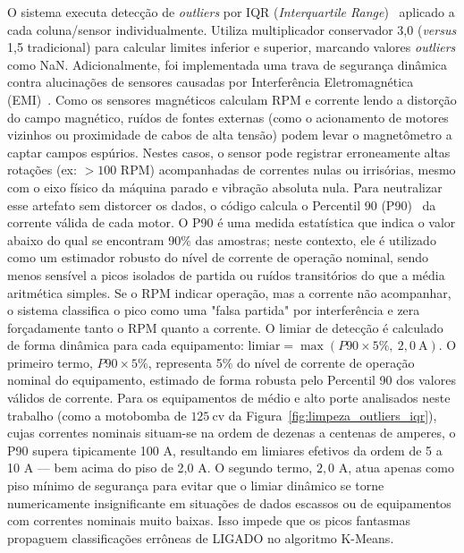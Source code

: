 O sistema executa detecção de \textit{outliers} por IQR (\textit{Interquartile Range})~\cite{tukey1977iqr} aplicado a cada coluna/sensor individualmente. Utiliza multiplicador conservador 3,0 (\textit{versus} 1,5 tradicional) para calcular limites inferior e superior, marcando valores \textit{outliers} como NaN. Adicionalmente, foi implementada uma trava de segurança dinâmica contra alucinações de sensores causadas por Interferência Eletromagnética (EMI)~\cite{romary2022airgap}. Como os sensores magnéticos calculam RPM e corrente lendo a distorção do campo magnético, ruídos de fontes externas (como o acionamento de motores vizinhos ou proximidade de cabos de alta tensão) podem levar o magnetômetro a captar campos espúrios. Nestes casos, o sensor pode registrar erroneamente altas rotações (ex: $> 100$ RPM) acompanhadas de correntes nulas ou irrisórias, mesmo com o eixo físico da máquina parado e vibração absoluta nula. Para neutralizar esse artefato sem distorcer os dados, o código calcula o Percentil 90 (P90)~\cite{tukey1977iqr} da corrente válida de cada motor. O P90 é uma medida estatística que indica o valor abaixo do qual se encontram 90\% das amostras; neste contexto, ele é utilizado como um estimador robusto do nível de corrente de operação nominal, sendo menos sensível a picos isolados de partida ou ruídos transitórios do que a média aritmética simples. Se o RPM indicar operação, mas a corrente não acompanhar, o sistema classifica o pico como uma "falsa partida" por interferência e zera forçadamente tanto o RPM quanto a corrente. O limiar de detecção é calculado de forma dinâmica para cada equipamento: $\text{limiar} = \max(P90 \times 5\%,\ 2{,}0\ \text{A})$. O primeiro termo, $P90 \times 5\%$, representa 5\% do nível de corrente de operação nominal do equipamento, estimado de forma robusta pelo Percentil 90 dos valores válidos de corrente. Para os equipamentos de médio e alto porte analisados neste trabalho (como a motobomba de $125~\text{cv}$ da Figura~\ref{fig:limpeza_outliers_iqr}), cujas correntes nominais situam-se na ordem de dezenas a centenas de amperes, o P90 supera tipicamente 100 A, resultando em limiares efetivos da ordem de 5 a 10 A --- bem acima do piso de 2,0 A. O segundo termo, $2{,}0$ A, atua apenas como piso mínimo de segurança para evitar que o limiar dinâmico se torne numericamente insignificante em situações de dados escassos ou de equipamentos com correntes nominais muito baixas. Isso impede que os picos fantasmas propaguem classificações errôneas de LIGADO no algoritmo K-Means.

